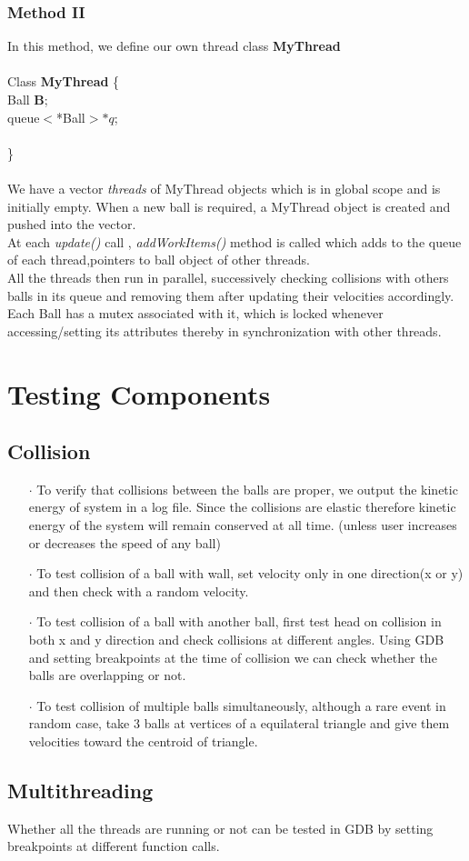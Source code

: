 \documentclass[a4paper,12pt]{report}
\begin{document}
\subsection*{Method II}
In this method, we define our own thread class \textbf{MyThread}\\\\
Class \textbf{MyThread} \{\\
\hspace*{1cm} Ball \textbf{B};\\
\hspace*{1cm} queue$<$*Ball$>* q$;\\\\
\}\\\\
We have a vector \textit{threads} of MyThread objects which is in global scope and is initially empty. When a new ball is required, a MyThread object is created and pushed into the vector.
\\
At each \textit{update()} call , \textit{addWorkItems()} method is called which adds to the queue of each thread,pointers to ball object of other threads.
\\
All the threads then run in parallel, successively checking collisions with others balls in its queue and removing them after updating their velocities accordingly.
\\
Each Ball has a mutex associated with it, which is locked whenever accessing/setting its attributes thereby in synchronization with other threads.
\chapter{Testing Components}
\section{Collision}
\begin{enumerate}
\item[$\cdot$] To verify that collisions between the balls are proper, we output the kinetic energy of system in a log file. Since the collisions are elastic therefore kinetic energy of the system will remain conserved at all time. (unless user increases or decreases the speed of any ball)
\item[$\cdot$] To test collision of a ball with wall, set velocity only in one direction(x or y) and then check with a random velocity.
\item[$\cdot$] To test collision of a ball with another ball, first test head on collision in both x and y direction and check collisions at different angles. Using GDB and setting breakpoints at the time of collision we can check whether the balls are overlapping or not. 
\item[$\cdot$] To test collision of multiple balls simultaneously, although a rare event in random case, take 3 balls at vertices of a equilateral triangle and give them velocities toward the centroid of triangle.
\end{enumerate}
\section{Multithreading}
Whether all the threads are running or not can be tested in GDB by setting breakpoints at different function calls.
\end{document}
